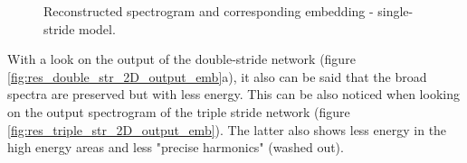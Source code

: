 \begin{figure}[htb!]
    \centering
    \captionsetup{justification=centering}
    \caption{Reconstructed spectrogram and corresponding embedding - single-stride model.}
    \label{fig:res_single_str_2D_output_emb}
\end{figure}

With a look on the output of the double-stride network (figure \ref{fig:res_double_str_2D_output_emb}a), it also can be said that the broad spectra are preserved but with less energy. This can be also noticed when looking on the output spectrogram of the triple stride network (figure \ref{fig:res_triple_str_2D_output_emb}). The latter also shows less energy in the high energy areas and less "precise harmonics" (washed out). 

